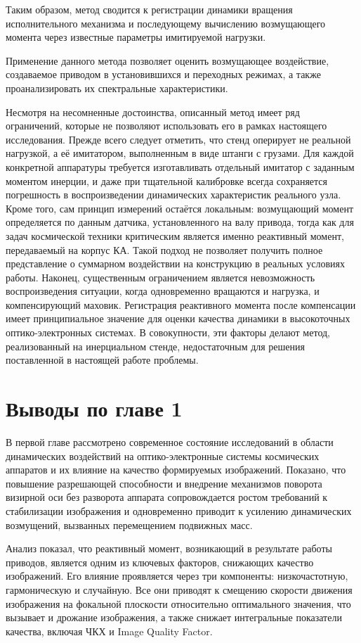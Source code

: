 Таким образом, метод сводится к регистрации динамики вращения исполнительного механизма и последующему вычислению возмущающего момента через известные параметры имитируемой нагрузки.

Применение данного метода позволяет оценить возмущающее воздействие, создаваемое приводом в установившихся и переходных режимах, а также проанализировать их спектральные характеристики.

Несмотря на несомненные достоинства, описанный метод имеет ряд ограничений, которые не позволяют использовать его в рамках настоящего исследования. Прежде всего следует отметить, что стенд оперирует не реальной нагрузкой, а её имитатором, выполненным в виде штанги с грузами. Для каждой конкретной аппаратуры требуется изготавливать отдельный имитатор с заданным моментом инерции, и даже при тщательной калибровке всегда сохраняется погрешность в воспроизведении динамических характеристик реального узла. Кроме того, сам принцип измерений остаётся локальным: возмущающий момент определяется по данным датчика, установленного на валу привода, тогда как для задач космической техники критическим является именно реактивный момент, передаваемый на корпус КА. Такой подход не позволяет получить полное представление о суммарном воздействии на конструкцию в реальных условиях работы. Наконец, существенным ограничением является невозможность воспроизведения ситуации, когда одновременно вращаются и нагрузка, и компенсирующий маховик. Регистрация реактивного момента после компенсации имеет принципиальное значение для оценки качества динамики в высокоточных оптико-электронных системах. В совокупности, эти факторы делают метод, реализованный на инерциальном стенде, недостаточным для решения поставленной в настоящей работе проблемы.

\section*{Выводы по главе 1}
В первой главе рассмотрено современное состояние исследований в области динамических воздействий на оптико-электронные системы космических аппаратов и их влияние на качество формируемых изображений. Показано, что повышение разрешающей способности и внедрение механизмов поворота визирной оси без разворота аппарата сопровождается ростом требований к стабилизации изображения и одновременно приводит к усилению динамических возмущений, вызванных перемещением подвижных масс.

Анализ показал, что реактивный момент, возникающий в результате работы приводов, является одним из ключевых факторов, снижающих качество изображений. Его влияние проявляется через три компоненты: низкочастотную, гармоническую и случайную. Все они приводят к смещению скорости движения изображения на фокальной плоскости относительно оптимального значения, что вызывает  и дрожание изображения, а также снижает интегральные показатели качества, включая ЧКХ и Image Quality Factor.

